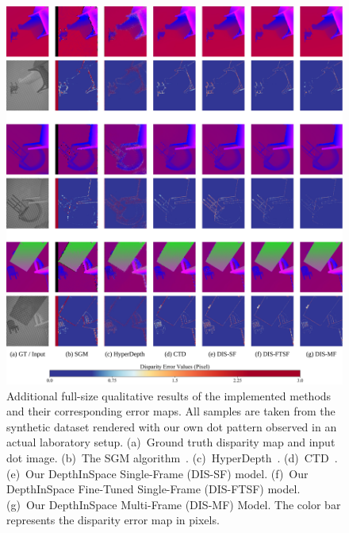\begin{figure}
    \begin{center}
        \includegraphics[width=1\linewidth]{images/chapter2/supp_figures/supp_results_3.jpg}
    \end{center}
   \caption{Additional full-size qualitative results of the implemented methods and their corresponding error maps. All samples are taken from the synthetic dataset rendered with our own dot pattern observed in an actual laboratory setup. (a)~Ground truth disparity map and input dot image. (b)~The SGM algorithm~\citep{hirschmuller2007stereo}. (c)~HyperDepth~\citep{ryan2016hyperdepth}. (d)~CTD~\citep{riegler2019connecting}. (e)~Our DepthInSpace Single-Frame (DIS-SF) model. (f)~Our DepthInSpace Fine-Tuned Single-Frame (DIS-FTSF) model. (g)~Our DepthInSpace Multi-Frame (DIS-MF) Model. The color bar represents the disparity error map in pixels.}
    \label{fig:c2_actual_results}
\end{figure}

